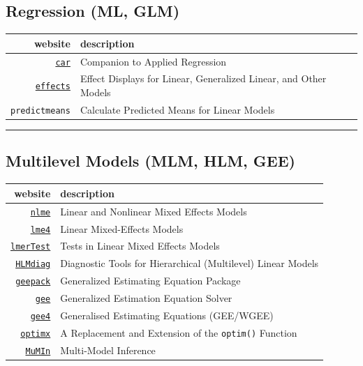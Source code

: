 \documentclass[]{book}
\theoremstyle{definition}
\theoremstyle{definition}
\theoremstyle{definition}
\theoremstyle{remark}
\begin{document}
\subsection{Regression (ML, GLM)}\label{regression-ml-glm}

\begin{longtable}[]{@{}rl@{}}
\toprule
website & description\tabularnewline
\midrule
\endhead
\href{https://www.statmethods.net/stats/rdiagnostics.html}{\texttt{car}}
& Companion to Applied Regression\tabularnewline
\href{https://www.jstatsoft.org/article/view/v008i15/effect-displays-revised.pdf}{\texttt{effects}}
& Effect Displays for Linear, Generalized Linear, and Other
Models\tabularnewline
\texttt{predictmeans} & Calculate Predicted Means for Linear
Models\tabularnewline
\bottomrule
\end{longtable}

\begin{center}\rule{0.5\linewidth}{\linethickness}\end{center}

\subsection{Multilevel Models (MLM, HLM,
GEE)}\label{multilevel-models-mlm-hlm-gee}

\begin{longtable}[]{@{}rl@{}}
\toprule
website & description\tabularnewline
\midrule
\endhead
\href{http://davidakenny.net/papers/k\&h/MLM_R.pdf}{\texttt{nlme}} &
Linear and Nonlinear Mixed Effects Models\tabularnewline
\href{https://github.com/lme4/lme4/}{\texttt{lme4}} & Linear
Mixed-Effects Models\tabularnewline
\href{https://github.com/runehaubo/lmerTestR}{\texttt{lmerTest}} & Tests
in Linear Mixed Effects Models\tabularnewline
\href{https://github.com/aloy/HLMdiag}{\texttt{HLMdiag}} & Diagnostic
Tools for Hierarchical (Multilevel) Linear Models\tabularnewline
\href{https://cran.r-project.org/web/packages/geepack/vignettes/geepack-manual.pdf}{\texttt{geepack}}
& Generalized Estimating Equation Package\tabularnewline
\href{https://cran.r-project.org/web/packages/gee/gee.pdf}{\texttt{gee}}
& Generalized Estimation Equation Solver\tabularnewline
\href{https://github.com/ypan1988/gee4}{\texttt{gee4}} & Generalised
Estimating Equations (GEE/WGEE)\tabularnewline
\href{file:///C:/Users/A00315273/Downloads/v43i09.pdf}{\texttt{optimx}}
& A Replacement and Extension of the \texttt{optim()}
Function\tabularnewline
\href{https://sites.google.com/site/rforfishandwildlifegrads/home/mumin_usage_examples}{\texttt{MuMIn}}
& Multi-Model Inference\tabularnewline
\bottomrule
\end{longtable}
\end{document}
